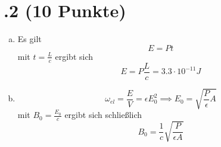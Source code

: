 \section*{\nr.2 \tittwo (10 Punkte)}
\begin{enumerate}[(a)]
\item Es gilt
\begin{equation}
  E=Pt
\end{equation}
mit $t=\frac{L}{c}$ ergibt sich
\begin{equation}
  E=P \frac{L}{c}=3.3\cdot 10^{-11}J
\end{equation}
\item 
\begin{equation}
  \omega_{el}=\frac{E}{V}=\epsilon E_0^2\implies E_0=\sqrt{\frac{P}{\epsilon}A}
\end{equation}
mit $B_0=\frac{E_0}{c}$ ergibt sich schließlich
\begin{equation}
  B_0 = \frac{1}{c}\sqrt{\frac{P}{\epsilon A}}
\end{equation}
\end{enumerate}
